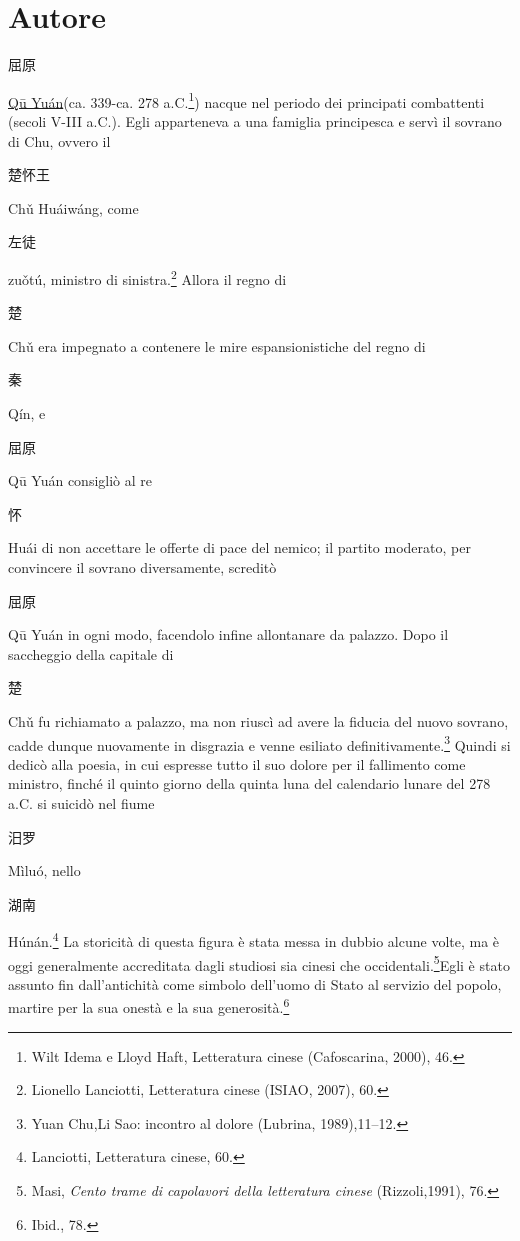 \documentclass[12pt,titlepage]{article}
\title{\textbf{\begin{CJK*}{UTF8}{gbsn}离骚\end{CJK*} LÍ SĀO INCONTRO AL DOLORE, POEMA DI \begin{CJK*}{UTF8}{gbsn}屈原\end{CJK*} QŪ YUÁN} }
\author{Francesca Godi}
\date{}
\begin{document}
	\maketitle
\section{Autore}
\begin{CJK*}{UTF8}{gbsn}
屈原
\end{CJK*}
\underline{Qū Yuán}(ca. 339-ca. 278 a.C.\footnote{Wilt Idema e Lloyd Haft, Letteratura cinese (Cafoscarina, 2000), 46.}) nacque nel periodo dei principati combattenti (secoli V-III a.C.). Egli apparteneva a una famiglia principesca e servì il sovrano di Chu, ovvero il 
\begin{CJK*}{UTF8}{gbsn}楚怀王\end{CJK*} 
Chǔ Huáiwáng, come 
\begin{CJK*}{UTF8}{gbsn}左徒 \end{CJK*}
zuǒtú, ministro di sinistra.\footnote{Lionello Lanciotti, Letteratura cinese (ISIAO, 2007), 60.} Allora il regno di 
\begin{CJK*}{UTF8}{gbsn}楚 \end{CJK*}
Chǔ era impegnato a contenere le mire espansionistiche del regno di 
\begin{CJK*}{UTF8}{gbsn}秦\end{CJK*} 
Qín, e 
\begin{CJK*}{UTF8}{gbsn}屈原\end{CJK*}
 Qū Yuán consigliò al re 
\begin{CJK*}{UTF8}{gbsn}怀\end{CJK*}Huái di non accettare le offerte di pace del nemico; il partito moderato, per convincere il sovrano diversamente, screditò \begin{CJK*}{UTF8}{gbsn}屈原 \end{CJK*}Qū Yuán in ogni modo, facendolo infine allontanare da palazzo. Dopo il saccheggio della capitale di \begin{CJK*}{UTF8}{gbsn}楚 \end{CJK*}Chǔ fu richiamato a palazzo, ma non riuscì ad avere la fiducia del nuovo sovrano, cadde dunque nuovamente in disgrazia e venne esiliato definitivamente.\footnote{Yuan Chu,Li Sao: incontro al dolore (Lubrina, 1989),11–12.} Quindi si dedicò alla poesia, in cui espresse tutto il suo dolore per il fallimento come ministro, finché il quinto giorno della quinta luna del calendario lunare del 278 a.C. si suicidò nel fiume \begin{CJK*}{UTF8}{gbsn}汨罗 \end{CJK*}Mìluó, nello \begin{CJK*}{UTF8}{gbsn}湖南 \end{CJK*}Húnán.\footnote{Lanciotti, Letteratura cinese, 60.} La storicità di questa figura è stata messa in dubbio alcune volte, ma è oggi generalmente accreditata dagli studiosi sia cinesi che occidentali.\footnote{Masi, \emph{Cento trame di capolavori della letteratura cinese} (Rizzoli,1991), 76.}Egli è stato assunto fin dall'antichità come simbolo dell'uomo di Stato al servizio del popolo, martire per la sua onestà e la sua generosità.\footnote{Ibid., 78.}
\end{document}
